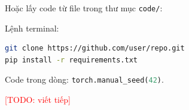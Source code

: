 \documentclass[11pt,a4paper]{article}
\newcommand{\todo}[1]{\textcolor{red}{[TODO: #1]}}
\begin{document}
Hoặc lấy code từ file trong thư mục \texttt{code/}:



Lệnh terminal:

\begin{lstlisting}[language=bash, numbers=none]
git clone https://github.com/user/repo.git
pip install -r requirements.txt
\end{lstlisting}

Code trong dòng: \lstinline[language=Python]|torch.manual_seed(42)|.

\todo{viết tiếp}



\end{document}
